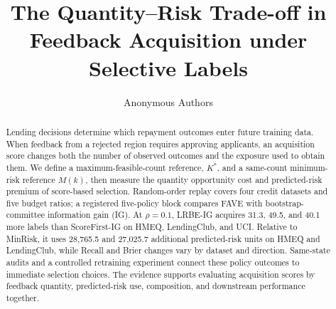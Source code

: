 \documentclass[runningheads]{llncs}
\title{The Quantity--Risk Trade-off in Feedback Acquisition under Selective Labels}
\author{Anonymous Authors}
\institute{Anonymous Institution}
\begin{document}
\maketitle
\begin{abstract}
Lending decisions determine which repayment outcomes enter future training data. When feedback from a rejected region requires approving applicants, an acquisition score changes both the number of observed outcomes and the exposure used to obtain them. We define a maximum-feasible-count reference, $K^*$, and a same-count minimum-risk reference $M(k)$, then measure the quantity opportunity cost and predicted-risk premium of score-based selection. Random-order replay covers four credit datasets and five budget ratios; a registered five-policy block compares FAVE with bootstrap-committee information gain (IG). At $\rho=0.1$, LRBE-IG acquires 31.3, 49.5, and 40.1 more labels than ScoreFirst-IG on HMEQ, LendingClub, and UCI. Relative to MinRisk, it uses 28,765.5 and 27,025.7 additional predicted-risk units on HMEQ and LendingClub, while Recall and Brier changes vary by dataset and direction. Same-state audits and a controlled retraining experiment connect these policy outcomes to immediate selection choices. The evidence supports evaluating acquisition scores by feedback quantity, predicted-risk use, composition, and downstream performance together.
\end{abstract}









\end{document}
